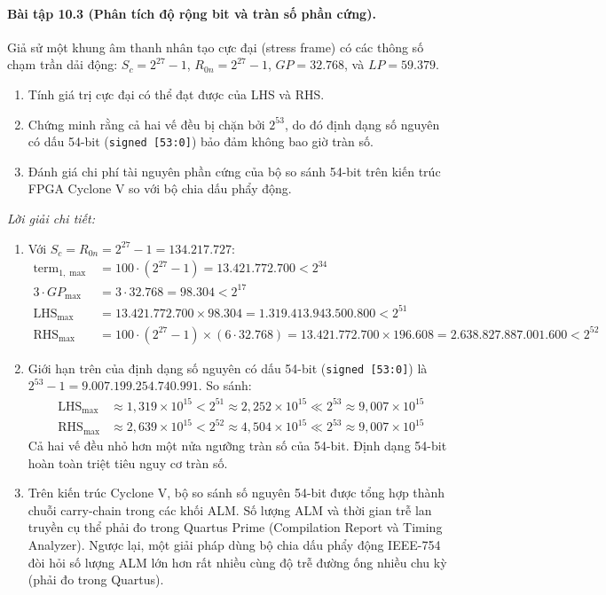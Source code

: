 \paragraph{Bài tập 10.3 (Phân tích độ rộng bit và tràn số phần cứng).}
Giả sử một khung âm thanh nhân tạo cực đại (stress frame) có các thông số chạm trần dải động: $S_c = 2^{27}-1$, $R_{0n} = 2^{27}-1$, $GP = 32.768$, và $LP = 59.379$.
\begin{enumerate}[label=(\alph*)]
    \item Tính giá trị cực đại có thể đạt được của LHS và RHS.
    \item Chứng minh rằng cả hai vế đều bị chặn bởi $2^{53}$, do đó định dạng số nguyên có dấu 54-bit (\texttt{signed [53:0]}) bảo đảm không bao giờ tràn số.
    \item Đánh giá chi phí tài nguyên phần cứng của bộ so sánh 54-bit trên kiến trúc FPGA Cyclone V so với bộ chia dấu phẩy động.
\end{enumerate}

\textit{Lời giải chi tiết:}
\begin{enumerate}[label=(\alph*)]
    \item Với $S_c = R_{0n} = 2^{27}-1 = 134.217.727$:
    \begin{align*}
        \text{term}_{1,\max} &= 100 \cdot (2^{27}-1) = 13.421.772.700 < 2^{34} \\
        3 \cdot GP_{\max} &= 3 \cdot 32.768 = 98.304 < 2^{17} \\
        \text{LHS}_{\max} &= 13.421.772.700 \times 98.304 = 1.319.413.943.500.800 < 2^{51} \\
        \text{RHS}_{\max} &= 100 \cdot (2^{27}-1) \times (6 \cdot 32.768) = 13.421.772.700 \times 196.608 = 2.638.827.887.001.600 < 2^{52}
    \end{align*}
    \item Giới hạn trên của định dạng số nguyên có dấu 54-bit (\texttt{signed [53:0]}) là $2^{53} - 1 = 9.007.199.254.740.991$.
    So sánh:
    \begin{align*}
        \text{LHS}_{\max} &\approx 1{,}319 \times 10^{15} < 2^{51} \approx 2{,}252 \times 10^{15} \ll 2^{53} \approx 9{,}007 \times 10^{15} \\
        \text{RHS}_{\max} &\approx 2{,}639 \times 10^{15} < 2^{52} \approx 4{,}504 \times 10^{15} \ll 2^{53} \approx 9{,}007 \times 10^{15}
    \end{align*}
    Cả hai vế đều nhỏ hơn một nửa ngưỡng tràn số của 54-bit. Định dạng 54-bit hoàn toàn triệt tiêu nguy cơ tràn số.
    \item Trên kiến trúc Cyclone V, bộ so sánh số nguyên 54-bit được tổng hợp thành chuỗi carry-chain trong các khối ALM. Số lượng ALM và thời gian trễ lan truyền cụ thể phải đo trong Quartus Prime (Compilation Report và Timing Analyzer). Ngược lại, một giải pháp dùng bộ chia dấu phẩy động IEEE-754 đòi hỏi số lượng ALM lớn hơn rất nhiều cùng độ trễ đường ống nhiều chu kỳ (phải đo trong Quartus).
\end{enumerate}

